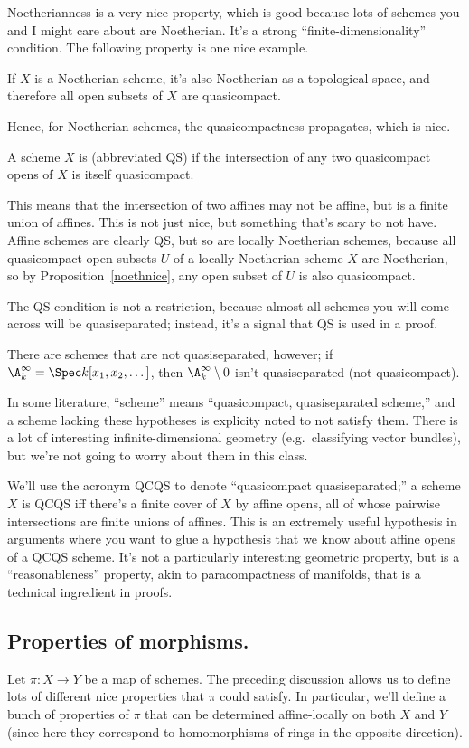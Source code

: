 Noetherianness is a very nice property, which is good because lots of schemes you and I might care about are
Noetherian. It's a strong ``finite-dimensionality'' condition. The following property is one nice example.
\begin{prop}
\label{noethnice}
If \(X\) is a Noetherian scheme, it's also Noetherian as a topological space, and therefore all open subsets of
\(X\) are quasicompact.
\end{prop}
Hence, for Noetherian schemes, the quasicompactness propagates, which is nice.
\begin{defn}
A scheme \(X\) is  (abbreviated QS) if the intersection of any two quasicompact opens of \(X\)
is itself quasicompact.
\end{defn}
This means that the intersection of two affines may not be affine, but is a finite union of affines. This is not
just nice, but something that's scary to not have. Affine schemes are clearly QS, but so are locally Noetherian
schemes, because all quasicompact open subsets \(U\) of a locally Noetherian scheme \(X\) are Noetherian, so by
Proposition~\ref{noethnice}, any open subset of \(U\) is also quasicompact.

The QS condition is not a restriction, because almost all schemes you will come across will be quasiseparated;
instead, it's a signal that QS is used in a proof.
\begin{exm}
There are schemes that are not quasiseparated, however; if \(\A_k^\infty = \Spec k[x_1,x_2,\dotsc]\), then
\(\A_k^\infty\setminus 0\) isn't quasiseparated (not quasicompact).
\end{exm}
In some literature, ``scheme'' means ``quasicompact, quasiseparated scheme,'' and a scheme lacking these hypotheses
is explicity noted to not satisfy them. There is a lot of interesting infinite-dimensional geometry (e.g.\
classifying vector bundles), but we're not going to worry about them in this class.

We'll use the acronym QCQS to denote ``quasicompact quasiseparated;'' a scheme \(X\) is QCQS iff there's a finite
cover of \(X\) by affine opens, all of whose pairwise intersections are finite unions of affines. This is an
extremely useful hypothesis in arguments where you want to glue a hypothesis that we know about affine opens of a
QCQS scheme. It's not a particularly interesting geometric property, but is a ``reasonableness'' property, akin to
paracompactness of manifolds, that is a technical ingredient in proofs.
\subsection*{Properties of morphisms.}
Let \(\pi:X\to Y\) be a map of schemes. The preceding discussion allows us to define lots of different nice
properties that \(\pi\) could satisfy. In particular, we'll define a bunch of properties of \(\pi\) that can be
determined affine-locally on both \(X\) and \(Y\) (since here they correspond to homomorphisms of rings in the
opposite direction).

